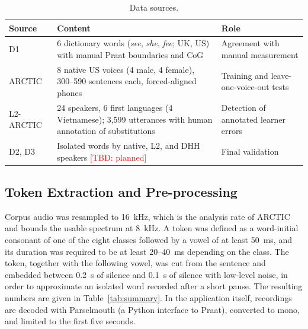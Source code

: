 \documentclass[conference]{IEEEtran}
\newcommand{\tbd}[1]{\textcolor{red}{[TBD: #1]}}
\begin{document}
\begin{table}[!htb]
\caption{Data sources.}
\label{tab:corpora}
\centering
\footnotesize
\begin{tabular}{p{1.6cm}p{2.9cm}p{3.1cm}}
\toprule
Source & Content & Role \\
\midrule
D1 & 6 dictionary words (\textit{see}, \textit{she}, \textit{fee}; UK, US) with manual Praat boundaries and CoG & Agreement with manual measurement \\
ARCTIC~\cite{kominek2004} & 8 native US voices (4 male, 4 female), 300--590 sentences each, forced-aligned phones & Training and leave-one-voice-out tests \\
L2-ARCTIC & 24 speakers, 6 first languages (4 Vietnamese); 3{,}599 utterances with human annotation of substitutions & Detection of annotated learner errors \\
D2, D3 & Isolated words by native, L2, and DHH speakers \tbd{planned} & Final validation \\
\bottomrule
\end{tabular}
\end{table}

\subsection{Token Extraction and Pre-processing}
Corpus audio was resampled to 16~kHz, which is the analysis rate of ARCTIC and bounds the usable spectrum at 8~kHz. A token was defined as a word-initial consonant of one of the eight classes followed by a vowel of at least 50~ms, and its duration was required to be at least 20--40~ms depending on the class. The token, together with the following vowel, was cut from the sentence and embedded between 0.2~s of silence and 0.1~s of silence with low-level noise, in order to approximate an isolated word recorded after a short pause. The resulting numbers are given in Table~\ref{tab:summary}. In the application itself, recordings are decoded with Parselmouth (a Python interface to Praat), converted to mono, and limited to the first five seconds.
\end{document}
